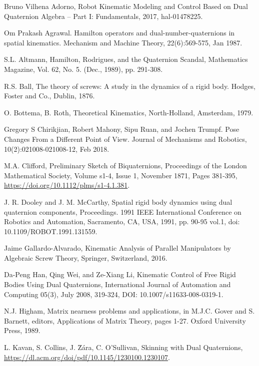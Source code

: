 \documentclass[reqno,12pt]{amsart}
\begin{document}
\begin{thebibliography}{99}

 Bruno Vilhena Adorno, Robot Kinematic Modeling and Control Based on Dual Quaternion Algebra -- Part I: Fundamentals, 2017, hal-01478225.

 Om Prakash Agrawal. Hamilton operators and dual-number-quaternions in spatial kinematics. Mechanism and Machine Theory, 22(6):569-575, Jan 1987.

 S.L. Altmann, Hamilton, Rodrigues, and the Quaternion Scandal, Mathematics Magazine, Vol. 62, No. 5. (Dec., 1989), pp. 291-308.

 R.S. Ball, The theory of screws: A study in the dynamics of a rigid body. Hodges, Foster and Co., Dublin, 1876.

 O. Bottema, B. Roth, Theoretical Kinematics, North-Holland, Amsterdam, 1979.

 Gregory S Chirikjian, Robert Mahony, Sipu Ruan, and Jochen Trumpf. Pose Changes From a Different Point of View. Journal of Mechanisms and Robotics, 10(2):021008-021008-12, Feb 2018.

 M.A. Clifford, Preliminary Sketch of Biquaternions, Proceedings of the London Mathematical Society, Volume s1-4, Issue 1, November 1871, Pages 381-395, \url{https://doi.org/10.1112/plms/s1-4.1.381}.

 J. R. Dooley and J. M. McCarthy, Spatial rigid body dynamics using dual quaternion components, Proceedings. 1991 IEEE International Conference on Robotics and Automation, Sacramento, CA, USA, 1991, pp. 90-95 vol.1, doi: 10.1109/ROBOT.1991.131559.

 Jaime Gallardo-Alvarado, Kinematic Analysis of Parallel Manipulators by Algebraic Screw Theory, Springer, Switzerland, 2016.

 Da-Peng Han, Qing Wei, and Ze-Xiang Li, Kinematic Control of Free Rigid Bodies Using Dual Quaternions, International Journal of Automation and Computing
05(3), July 2008, 319-324, DOI: 10.1007/s11633-008-0319-1.

 N.J. Higham, Matrix nearness problems and applications, in M.J.C. Gover and S. Barnett, editors, Applications of Matrix Theory, pages 1-27. Oxford University Press, 1989.

 L. Kavan, S. Collins, J. \u Z\'ara, C. O'Sullivan, Skinning with Dual Quaternions, \url{https://dl.acm.org/doi/pdf/10.1145/1230100.1230107}.


\end{thebibliography}
\end{document}
